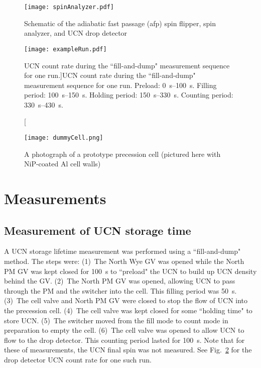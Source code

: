 \begin{figure}[htp]
    \centering
    \texttt{[image: spinAnalyzer.pdf]}
    \caption{Schematic of the adiabatic fast passage (\acrshort{afp}) spin flipper, spin analyzer, and UCN drop detector}
    \label{fig:SpinAnalyzer}
\end{figure}

\begin{figure}[htp]
    \centering
    \texttt{[image: exampleRun.pdf]}
    \caption[UCN count rate during the ``fill-and-dump" measurement sequence for one run.]{UCN count rate during the ``fill-and-dump" measurement sequence for one run. Preload: \qtyrange{0}{100}{\s}. Filling period: \qtyrange{100}{150}{\s}. Holding period: \qtyrange{150}{330}{\s}. Counting period: \qtyrange{330}{430}{\s}.}
    \label{fig:timeSpectrum}
\end{figure}

\begin{figure}[htp]
    \centering
    \texttt{[image: dummyCell.png]}
    \caption[A photograph of a prototype precession cell]{A photograph of a prototype precession cell (pictured here with NiP-coated Al cell walls)}
    \label{fig:dummyCell}
\end{figure}


\section{\label{sec:measurement}Measurements}

\subsection{\label{subsec:holdingTimeMeasurement}Measurement of UCN storage time}


A UCN storage lifetime measurement was performed using a ``fill-and-dump" method. The steps were: (1)~The North Wye GV was opened while the North PM GV was kept closed for \qty{100}{\s} to ``preload" the UCN to build up UCN density behind the GV. (2)~The North PM GV was opened, allowing UCN to pass through the PM and the switcher into the cell. This filling period was \qty{50}{\s}. (3)~The cell valve and North PM GV were closed to stop the flow of UCN into the precession cell. (4)~The cell valve was kept closed for some ``holding time" to store UCN. (5)~The switcher moved from the fill mode to count mode in preparation to empty the cell. (6)~The cell valve was opened to allow UCN to flow to the drop detector. This counting period lasted for \qty{100}{\s}. Note that for these of measurements, the UCN final spin was not measured. See Fig.~\ref{fig:timeSpectrum} for the drop detector UCN count rate for one such run.

